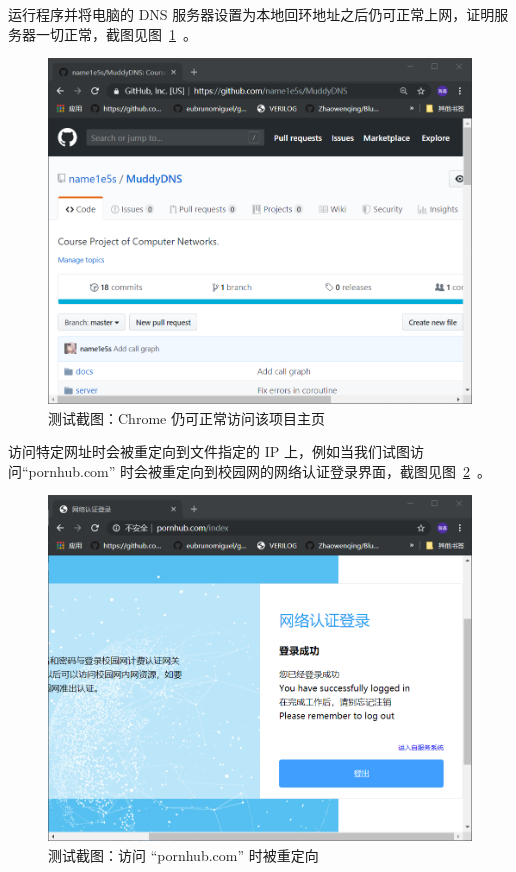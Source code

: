 \documentclass[blue,normal,cn]{elegantnote}
\begin{document}
运行程序并将电脑的 DNS 服务器设置为本地回环地址之后仍可正常上网，证明服务器一切正常，截图见图~\ref{test_chrome}~。

\begin{figure}[!htbp]
	\centering
	\includegraphics[width=.9\textwidth]{test_chrome.png}
	\caption{测试截图：Chrome 仍可正常访问该项目主页}
	\label{test_chrome}
\end{figure}

访问特定网址时会被重定向到文件指定的 IP 上，例如当我们试图访问``pornhub.com'' 时会被重定向到校园网的网络认证登录界面，截图见图~\ref{test_phub}~。

\newpage

\begin{figure}[!htbp]
	\centering
	\includegraphics[width=.9\textwidth]{test_phub.png}
	\caption{测试截图：访问 ``pornhub.com'' 时被重定向}
	\label{test_phub}
\end{figure}
\end{document}
